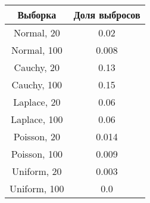\begin{tabular}{|c|c|}
\hline
 Выборка & Доля выбросов\\
\hline
Normal, 20 & 0.02\\
\hline
Normal, 100 & 0.008\\
\hline
Cauchy, 20 & 0.13\\
\hline
Cauchy, 100 & 0.15\\
\hline
Laplace, 20 & 0.06\\
\hline
Laplace, 100 & 0.06\\
\hline
Poisson, 20 & 0.014\\
\hline
Poisson, 100 & 0.009\\
\hline
Uniform, 20 & 0.003\\
\hline
Uniform, 100 & 0.0\\
\hline
\end{tabular}

